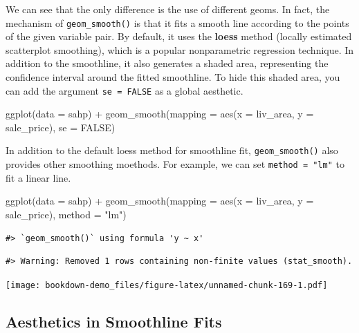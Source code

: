 \documentclass[
]{book}
\newenvironment{Shaded}{\begin{snugshade}}{\end{snugshade}}
\newcommand{\AttributeTok}[1]{\textcolor[rgb]{0.77,0.63,0.00}{#1}}
\newcommand{\ConstantTok}[1]{\textcolor[rgb]{0.00,0.00,0.00}{#1}}
\newcommand{\FunctionTok}[1]{\textcolor[rgb]{0.00,0.00,0.00}{#1}}
\newcommand{\NormalTok}[1]{#1}
\newcommand{\SpecialCharTok}[1]{\textcolor[rgb]{0.00,0.00,0.00}{#1}}
\newcommand{\StringTok}[1]{\textcolor[rgb]{0.31,0.60,0.02}{#1}}
\begin{document}
We can see that the only difference is the use of different geoms. In fact, the mechanism of \texttt{geom\_smooth()} is that it fits a smooth line according to the points of the given variable pair. By default, it uses the \textbf{loess} method (locally estimated scatterplot smoothing), which is a popular nonparametric regression technique. In addition to the smoothline, it also generates a shaded area, representing the confidence interval around the fitted smoothline. To hide this shaded area, you can add the argument \texttt{se\ =\ FALSE} as a global aesthetic.

\begin{Shaded}
\begin{Highlighting}[]
\FunctionTok{ggplot}\NormalTok{(}\AttributeTok{data =}\NormalTok{ sahp) }\SpecialCharTok{+} \FunctionTok{geom\_smooth}\NormalTok{(}\AttributeTok{mapping =} \FunctionTok{aes}\NormalTok{(}\AttributeTok{x =}\NormalTok{ liv\_area, }\AttributeTok{y =}\NormalTok{ sale\_price), }\AttributeTok{se =} \ConstantTok{FALSE}\NormalTok{)}
\end{Highlighting}
\end{Shaded}

In addition to the default loess method for smoothline fit, \texttt{geom\_smooth()} also provides other smoothing moethods. For example, we can set \texttt{method\ =\ "lm"} to fit a linear line.

\begin{Shaded}
\begin{Highlighting}[]
\FunctionTok{ggplot}\NormalTok{(}\AttributeTok{data =}\NormalTok{ sahp) }\SpecialCharTok{+} \FunctionTok{geom\_smooth}\NormalTok{(}\AttributeTok{mapping =} \FunctionTok{aes}\NormalTok{(}\AttributeTok{x =}\NormalTok{ liv\_area, }\AttributeTok{y =}\NormalTok{ sale\_price), }\AttributeTok{method =} \StringTok{"lm"}\NormalTok{)}
\end{Highlighting}
\end{Shaded}

\begin{verbatim}
#> `geom_smooth()` using formula 'y ~ x'
\end{verbatim}

\begin{verbatim}
#> Warning: Removed 1 rows containing non-finite values (stat_smooth).
\end{verbatim}

\texttt{[image: bookdown-demo\_files/figure-latex/unnamed-chunk-169-1.pdf]}

\hypertarget{aesthetics-in-smoothline-fits}{%
\subsection{Aesthetics in Smoothline Fits}\label{aesthetics-in-smoothline-fits}}
\end{document}
